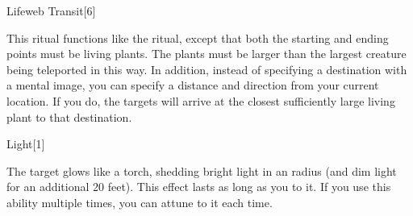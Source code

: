 \begin{spellsection}{Lifeweb Transit}[6]
\begin{spellcontent}
\begin{spelltargetinginfo}
\end{spelltargetinginfo}
\begin{spelleffects}
\spelleffect
This ritual functions like the  ritual, except that both the starting and ending points must be living plants.
The plants must be larger than the largest creature being teleported in this way.
In addition, instead of specifying a destination with a mental image, you can specify a distance and direction from your current location.
If you do, the targets will arrive at the closest sufficiently large living plant to that destination.
\end{spelleffects}
\end{spellcontent}
\begin{spellfooter}
\end{spellfooter}
\begin{spellsubcontent}
\end{spellsubcontent}
\end{spellsection}
\begin{spellsection}{Light}[1]
\begin{spellcontent}
\begin{spelltargetinginfo}
\end{spelltargetinginfo}
\begin{spelleffects}
\spelleffect
The target glows like a torch, shedding bright light in an \areamed radius (and dim light for an additional 20 feet).
This effect lasts as long as you  to it.
If you use this ability multiple times, you can attune to it each time.
\end{spelleffects}
\end{spellcontent}
\begin{spellfooter}
\end{spellfooter}
\begin{spellsubcontent}
\end{spellsubcontent}
\end{spellsection}
